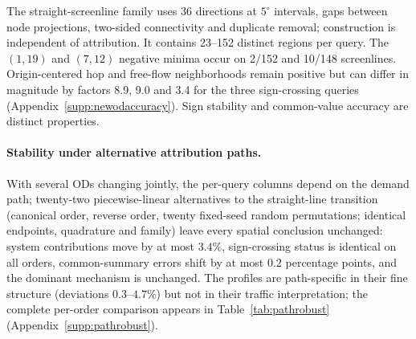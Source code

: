 The straight-screenline family uses 36 directions at $5^\circ$ intervals, gaps between node projections, two-sided connectivity and duplicate removal; construction is independent of attribution. It contains 23--152 distinct regions per query. The $(1,19)$ and $(7,12)$ negative minima occur on 2/152 and 10/148 screenlines. Origin-centered hop and free-flow neighborhoods remain positive but can differ in magnitude by factors 8.9, 9.0 and 3.4 for the three sign-crossing queries (Appendix~\ref{supp:newodaccuracy}). Sign stability and common-value accuracy are distinct properties.

\paragraph{Stability under alternative attribution paths.}\label{subsec:pathrobust}
With several ODs changing jointly, the per-query columns depend on the
demand path; twenty-two piecewise-linear alternatives to the
straight-line transition (canonical order, reverse order, twenty
fixed-seed random permutations; identical endpoints, quadrature and
family) leave every spatial conclusion unchanged: system contributions
move by at most $3.4\%$, sign-crossing status is identical on all
orders, common-summary errors shift by at most $0.2$ percentage
points, and the dominant mechanism is unchanged. The profiles are
path-specific in their fine structure (deviations $0.3$--$4.7\%$) but
not in their traffic interpretation; the complete per-order comparison
appears in Table~\ref{tab:pathrobust} (Appendix~\ref{supp:pathrobust}).
